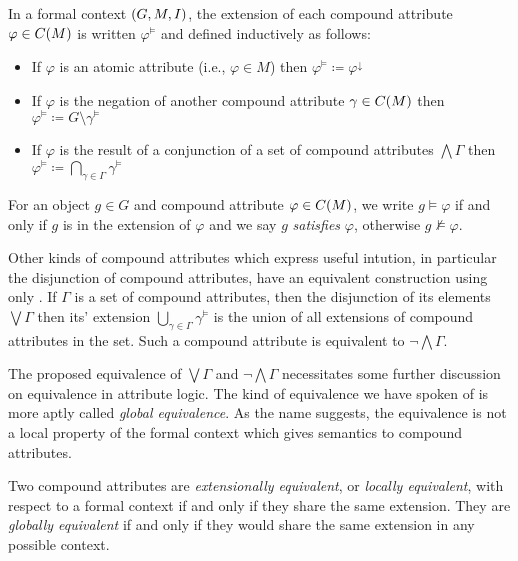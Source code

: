 \begin{definition}
	\label{definition:compound-attributes-semantics} 

	In a formal context $(G,M,\mathrel{I})$, the extension of each compound attribute $\varphi \in C(M)$ is written $\varphi^{\vDash}$
	and defined inductively as follows: 
	\begin{itemize}[itemsep=-0em]
		\item If $\varphi$ is an atomic attribute (i.e., $\varphi \in M$) then $\varphi^{\vDash}\coloneq \varphi^{\downarrow}$

		\item If $\varphi$ is the negation of another compound attribute $\gamma \in C(M)$ then $\varphi^{\vDash}\coloneq G
			\setminus \gamma^{\vDash}$

		\item If $\varphi$ is the result of a conjunction of a set of compound attributes $\bigwedge \Gamma$ then $\varphi^{\vDash}
			\coloneq \underset{\gamma \in \Gamma}\bigcap \gamma^{\vDash}$
	\end{itemize}
	For an object $g\in G$ and compound attribute $\varphi \in C(M)$, we write $g \vDash \varphi$ if and only if $g$ is
	in the extension of $\varphi$ and we say $g$ \emph{satisfies} $\varphi$, otherwise $g \nvDash \varphi$.
\end{definition}

Other kinds of compound attributes which express useful intution, in particular the disjunction of compound attributes, have
an equivalent construction using only . If $\Gamma$ is a set of compound attributes,
then the disjunction of its elements $\bigvee \Gamma$ then its' extension $\bigcup_{\gamma \in \Gamma}\gamma^{\vDash}$
is the union of all extensions of compound attributes in the set. Such a compound attribute is equivalent to $\neg \bigwedge
\Gamma$.

The proposed equivalence of $\bigvee \Gamma$ and $\neg \bigwedge \Gamma$ necessitates some further discussion on equivalence
in attribute logic. The kind of equivalence we have spoken of is more aptly called \textit{global equivalence}. As the
name suggests, the equivalence is not a local property of the formal context which gives semantics to compound attributes.

\begin{definition}
	\label{definition:equivalence-compound-attributes}

	Two compound attributes are \textit{extensionally equivalent}, or \textit{locally equivalent}, with respect to a
	formal context if and only if they share the same extension. They are \textit{globally equivalent} if and only if they
	would share the same extension in any possible context.
\end{definition}


